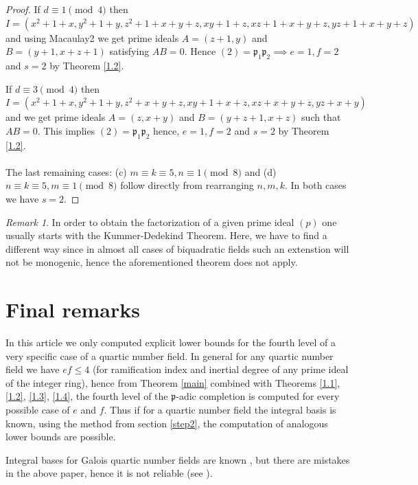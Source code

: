 \documentclass[12pt]{article}
\theoremstyle{remark}
\newtheorem{remark}[thm]{Remark}
\newcommand{\p}{\mathfrak{p}}
\begin{document}
\begin{proof}
If $d \equiv 1 \pmod{4}$ then $I = (x^2+1+x,y^2+1+y,z^2+1+x+y+z,xy+1+z,xz+1+x+y+z,yz+1+x+y+z)$ and using Macaulay2 we get prime ideals $A=(z+1,y)$ and $B = (y+1,x+z+1)$ satisfying $AB = 0$. Hence $  (2) = \mathfrak{p}_1\mathfrak{p}_2 \implies e=1,f=2$ and $s=2$ by Theorem \ref{1.2}.

If $d \equiv 3 \pmod{4}$ then $I = (x^2+1+x,y^2+1+y,z^2+x+y+z,xy+1+x+z,xz+x+y+z,yz+x+y) $ and we get prime ideals $A = (z,x+y)$ and $B = (y+z+1,x+z)$ such that $AB = 0$. This implies $ (2) = \mathfrak{p}_1\mathfrak{p}_2 $ hence, $ e=1,f=2$ and $ s=2$ by Theorem \ref{1.2}.
\\ \\
The last remaining cases: (c) $m \equiv k \equiv 5, n \equiv 1 \pmod{8}$ and (d) $n \equiv k \equiv 5, m \equiv 1 \pmod{8}$ follow directly from rearranging $n,m,k$. In both cases we have $s=2$.

\end{proof}


\begin{remark}
In order to obtain the factorization of a given prime ideal $(p)$ one usually starts with the Kummer-Dedekind Theorem. Here, we have to find a different way since in almost all cases of biquadratic fields such an extenstion will not be monogenic, hence the aforementioned theorem does not apply.
\end{remark}





\section{Final remarks} \label{gen}


In this article we only computed explicit lower bounds for the fourth level of a very specific case of a quartic number field. In general for any quartic number field we have $ef \leq 4$ (for ramification index and inertial degree of any prime ideal of the integer ring), hence from Theorem \ref{main} combined with Theorems \ref{1.1}, \ref{1.2}, \ref{1.3}, \ref{1.4}, the fourth level of the $\p$-adic completion is computed for every possible case of $e$ and $f$. Thus if for a quartic number field the integral basis is known, using the method from section \ref{step2},  the computation of analogous lower bounds are possible. 

Integral bases for Galois quartic number fields are known \cite{albert1930}, but there are mistakes in the above paper, hence it is not reliable (see \cite{hw1990}).
\end{document}
